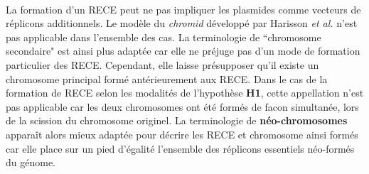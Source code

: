\\
La formation d'un RECE peut ne pas impliquer les plasmides comme vecteurs de réplicons additionnels. Le modèle du \textit{chromid} développé par Harisson \textit{et al.} n'est pas applicable dans l'ensemble des cas. La terminologie de ``chromosome secondaire" est ainsi plus adaptée car elle ne préjuge pas d'un mode de formation particulier des RECE. Cependant, elle laisse présupposer qu'il existe un chromosome principal formé antérieurement aux RECE. Dans le cas de la formation de RECE selon les modalités de l'hypothèse \textbf{H1}, cette appellation n'est pas applicable car les deux chromosomes ont été formés de facon simultanée, lors de la scission du chromosome originel. La terminologie de \textbf{néo-chromosomes} apparaît alors mieux adaptée pour décrire les RECE et chromosome ainsi formés car elle place sur un pied d'égalité l'ensemble des réplicons essentiels néo-formés du génome.
    
    
   
